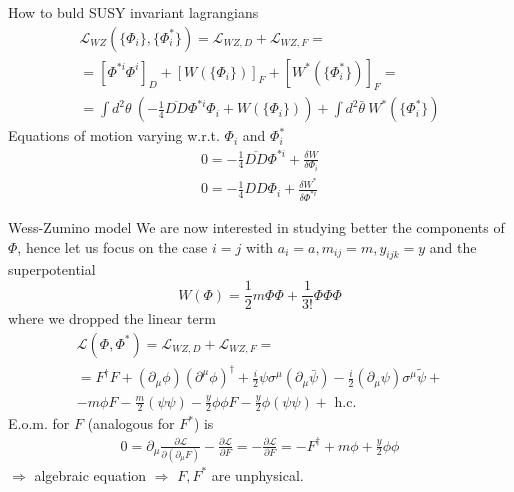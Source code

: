 \documentclass[10pt]{beamer}
\begin{document}
\begin{frame}{How to buld SUSY invariant lagrangians}
\begin{gather*}
\mathcal{L}_{WZ}\left(\{\Phi_i\}, \{\Phi^*_i\}\right) = \mathcal{L}_{WZ,D} + \mathcal{L}_{WZ,F} = \\
= \left[\Phi^{*i}\Phi^i\right]_D + \left[W(\{\Phi_i\})\right]_F +  \left[W^*(\{\Phi^*_i\})\right]_F = \\
= \boxed{\int d^2\theta \ \left(-\frac{1}{4}\overline{DD}\Phi^{*i}\Phi_i + W(\{\Phi_i\})\right) + \int d^2\bar\theta \ W^*(\{\Phi^*_i\})}
\end{gather*}
Equations of motion varying w.r.t. $\Phi_i$ and $\Phi_i^*$
\begin{gather*}
    0=-\frac{1}{4} \overline{D D} \Phi^{* i}+\frac{\delta W}{\delta \Phi_{i}} \\
    0=-\frac{1}{4} D D \Phi_{i}+\frac{\delta W^{*}}{\delta \Phi^{* i}}
\end{gather*}
\end{frame}

\begin{frame}{Wess-Zumino model}
    We are now interested in studying better the components of $\Phi$, hence let us focus on the case $i=j$ with $a_{i} = a, m_{ij}=m, y_{ijk}=y$ and the superpotential
    \begin{equation*}
        W(\Phi) = \frac{1}{2} m \Phi\Phi + \frac{1}{3!} \Phi \Phi \Phi
    \end{equation*}
    where we dropped the linear term
    \begin{gather*}
        \mathcal{L}(\Phi, \Phi^*) = \mathcal{L}_{WZ, D} + \mathcal{L}_{WZ, F} = \\ 
        = F^{\dagger} F+\left(\partial_{\mu} \phi\right)\left(\partial^{\mu} \phi\right)^{\dagger}+\frac{i}{2} \psi \sigma^{\mu}\left(\partial_{\mu} \bar{\psi}\right)-\frac{i}{2}\left(\partial_{\mu} \psi\right) \sigma^{\mu} \tilde{\psi} + \\
            -m \phi F-\frac{m}{2}(\psi \psi)-\frac{y}{2} \phi \phi F-\frac{y}{2} \phi(\psi \psi)+\text { h.c. }
    \end{gather*}
    E.o.m. for $F$ (analogous for $F^*$) is
    \begin{gather*}
        0=\partial_{\mu} \frac{\partial \mathcal{L}}{\partial\left(\partial_{\mu} F\right)}-\frac{\partial \mathcal{L}}{\partial F}=-\frac{\partial \mathcal{L}}{\partial F}=-F^{\dagger}+m \phi+\frac{y}{2} \phi \phi
    \end{gather*}
    $\Rightarrow$ algebraic equation $\Rightarrow$ $F,F^*$ are unphysical. 
\end{frame}
\end{document}
